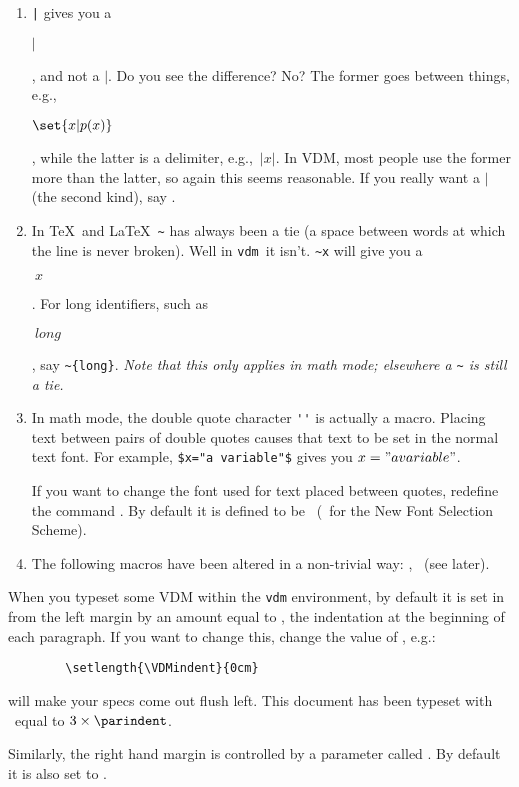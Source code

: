 \documentclass{article}
\newcommand{\Vdm}{{\tt vdm\/}}
\newenvironment{dangerous}{\par\vspace{5pt}\bgroup\small\noindent}%
                          {\par\egroup\vspace{5pt}}
\renewcommand{\^}[1]{$\langle${\rm #1\/}$\rangle$}
\newcommand{\cs}[1]{\leavevmode\hbox{\tt \string#1}}
\begin{document}
\begin{enumerate}
        the inverse.  Example: \verb;a-b \ne\mathminus a-b; gives
        \begin{vdm}$a-b \ne\mathminus a-b$\end{vdm}.
\item   \verb;|; gives you a \begin{vdm}$|$\end{vdm}, and not a $\vert$.
        Do you see the difference?  No?  The former goes between things,
        e.g., \begin{vdm}$\set{x|p(x)}$\end{vdm}, while the latter is
        a delimiter, e.g.,~$\vert x\vert$.
        In VDM, most people use the former more than the latter, so again this
        seems reasonable.
        If you really want a $\vert$ (the second kind),
        say \cs\vert.
\item   In \TeX\ and \LaTeX\ \verb;~; has always been a tie (a space
        between words at which the line is never broken).  Well
        in \Vdm\ it isn't.  \verb;~x; will give you a
        \begin{vdm}$~x$\end{vdm}.  For long identifiers, such as
        \begin{vdm}$~{long}$\end{vdm}, say
        \verb;~{long};.
        {\em Note that this only applies in math
        mode; elsewhere a \verb;~; is still a tie.}
\item   In math mode, the double quote character \verb;''; is actually
        a macro.  Placing text between pairs of double quotes causes
        that text to be set in the normal text font.  For example,
        \verb;$x="a variable"$; gives you $x="a variable"$.
        \begin{dangerous}
        \indent If you want to change the font used for text placed between
        quotes, redefine the command \cs\mathTextFont.  By default
        it is defined to be \cs\rm\ (\cs\mathrm\ for the New Font
        Selection Scheme).
        \end{dangerous}
\item   The following macros have been altered in a non-trivial way:
        \cs\forall, \cs\exists\ (see later).
\end{enumerate}

\begin{dangerous}
When you typeset some VDM within the {\tt vdm\/} environment, by
default it is set in from the left margin by an amount equal to
\cs\parindent, the indentation at the beginning of each paragraph.
If you want to change this, change the value of \cs\VDMindent, e.g.:
\begin{verbatim}
        \setlength{\VDMindent}{0cm}
\end{verbatim}
will make your specs come out flush left.  This document has been
typeset with \cs\VDMindent\ equal to $3\times \cs\parindent$.

Similarly, the right hand margin is controlled by a parameter called
\cs\VDMrindent.  By default it is also set to \cs\parindent.
\end{dangerous}
\end{document}
